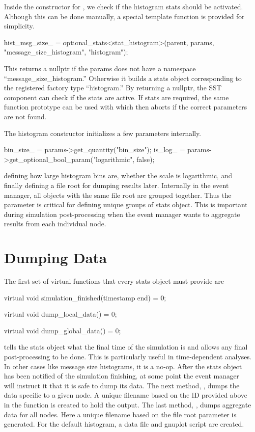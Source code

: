 Inside the constructor for , we check if the histogram stats should be activated.
Although this can be done manually, a special template function is provided for simplicity.


\begin{CppCode}
hist_msg_size_ = optional_stats<stat_histogram>(parent,
        params, "message_size_histogram", "histogram");
\end{CppCode}
This returns a nullptr if the params does not have a namespace ``message\_size\_histogram.''  Otherwise it builds a stats object corresponding to the registered factory type ``histogram.'' By returning a nullptr, the SST component can check if the stats are active.  If stats are required, the same function prototype can be used with  which then aborts if the correct parameters are not found. 

The histogram constructor initializes a few parameters internally.

\begin{CppCode}
bin_size_ = params->get_quantity("bin_size");
is_log_ = params->get_optional_bool_param("logarithmic", false);
\end{CppCode}
defining how large histogram bins are, whether the scale is logarithmic, and finally defining a file root for dumping results later.
Internally in the event manager, all objects with the same file root are grouped together.
Thus the  parameter is critical for defining unique groups of stats object.
This is important during simulation post-processing when the event manager wants to aggregate results from each individual node.

\section{Dumping Data}\label{sec:dumping}
The first set of virtual functions that every stats object must provide are

\begin{CppCode}
virtual void
simulation_finished(timestamp end) = 0;

virtual void
dump_local_data() = 0;

virtual void
dump_global_data() = 0;
\end{CppCode}

 tells the stats object what the final time of the simulation is and allows any final post-processing to be done.
This is particularly useful in time-dependent analyses.  In other cases like message size histograms, it is a no-op.
After the stats object has been notified of the simulation finishing, at some point the event manager will instruct it that it is safe to dump its data.
The next method, , dumps the data specific to a given node.
A unique filename based on the ID provided above in the  function is created to hold the output.
The last method, , dumps aggregate data for all nodes.
Here a unique filename based on the file root parameter is generated.
For the default histogram, a data file and gnuplot script are created.

